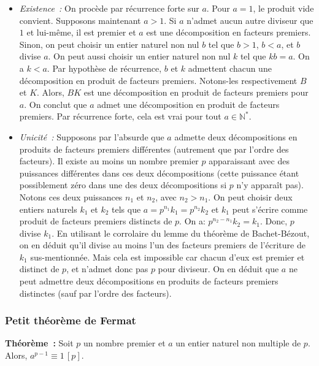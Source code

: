 \begin{itemize}
    \item \textit{Existence :} On procède par récurrence forte sur $a$. 
    Pour $a=1$, le produit vide convient. 
    Supposons maintenant $a > 1$. 
    Si $a$ n'admet aucun autre diviseur que $1$ et lui-même, il est premier et $a$ est une décomposition en facteurs premiers. 
    Sinon, on peut choisir un entier naturel non nul $b$ tel que $b > 1$, $b < a$, et $b$ divise $a$. 
    On peut aussi choisir un entier naturel non nul $k$ tel que $k b = a$. 
    On a $k < a$. 
    Par hypothèse de récurrence, $b$ et $k$ admettent chacun une décomposition en produit de facteurs premiers. 
    Notons-les respectivement $B$ et $K$.
    Alors, $B K$ est une décomposition en produit de facteurs premiers pour $a$. 
    On conclut que $a$ admet une décomposition en produit de facteurs premiers. 
    Par récurrence forte, cela est vrai pour tout $a \in \mathbb{N}^*$.
    \item \textit{Unicité :} 
    Supposons par l'absurde que $a$ admette deux décompositions en produits de facteurs premiers différentes (autrement que par l'ordre des facteurs). 
    Il existe au moins un nombre premier $p$ apparaissant avec des puissances différentes dans ces deux décompositions (cette puissance étant possiblement zéro dans une des deux décompositions si $p$ n'y apparaît pas). 
    Notons ces deux puissances $n_1$ et $n_2$, avec $n_2 > n_1$. 
    On peut choisir deux entiers naturels $k_1$ et $k_2$ tels que $a = p^{n_1} k_1 = p^{n_2} k_2$ et $k_1$ peut s'écrire comme produit de facteurs premiers distincts de $p$. 
    On a: $p^{n_2 - n_1} k_2 = k_1$. 
    Donc, $p$ divise $k_1$. 
    En utilisant le corrolaire du lemme du théorème de Bachet-Bézout, on en déduit qu'il divise au moins l'un des facteurs premiers de l'écriture de $k_1$ sus-mentionnée. 
    Mais cela est impossible car chacun d'eux est premier et distinct de $p$, et n'admet donc pas $p$ pour diviseur.
    On en déduit que $a$ ne peut admettre deux décompositions en produits de facteurs premiers distinctes (sauf par l'ordre des facteurs).
\end{itemize}

\done

\subsubsection{Petit théorème de Fermat}

\noindent\textbf{Théorème :} Soit $p$ un nombre premier et $a$ un entier naturel non multiple de $p$. 
Alors, $a^{p-1} \equiv 1 \, [p]$.

